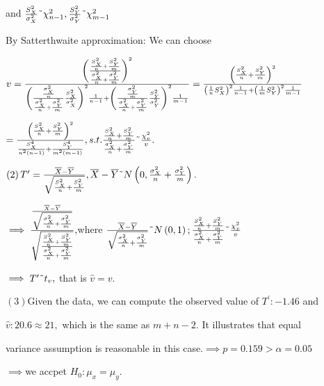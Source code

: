 \documentclass{article}
\begin{document}
and $\frac{S_{X}^{2}}{\sigma _{X}^{2}}\symbol{126}\chi _{n-1}^{2},\frac{%
S_{Y}^{2}}{\sigma _{Y}^{2}}\symbol{126}\chi _{m-1}^{2}$

By Satterthwaite approximation: We can choose 

$v=\frac{\left( \frac{\frac{S_{X}^{2}}{n}+\frac{S_{Y}^{2}}{m}}{\frac{\sigma
_{X}^{2}}{n}+\frac{\sigma _{Y}^{2}}{m}}\right) ^{2}}{\left( \frac{\frac{%
\sigma _{X}^{2}}{n}}{\frac{\sigma _{X}^{2}}{n}+\frac{\sigma _{Y}^{2}}{m}}%
\frac{S_{X}^{2}}{\sigma _{X}^{2}}\right) ^{2}\frac{1}{n-1}+\left( \frac{%
\frac{\sigma _{Y}^{2}}{m}}{\frac{\sigma _{X}^{2}}{n}+\frac{\sigma _{Y}^{2}}{m%
}}\frac{S_{Y}^{2}}{\sigma _{Y}^{2}}\right) ^{2}\frac{1}{m-1}}=\frac{\left( 
\frac{S_{X}^{2}}{n}+\frac{S_{Y}^{2}}{m}\right) ^{2}}{\left( \frac{1}{n}%
S_{X}^{2}\right) ^{2}\frac{1}{n-1}+\left( \frac{1}{m}S_{Y}^{2}\right) ^{2}%
\frac{1}{m-1}}$

$=\frac{\left( \frac{S_{X}^{2}}{n}+\frac{S_{Y}^{2}}{m}\right) ^{2}}{\frac{%
S_{X}^{4}}{n^{2}\left( n-1\right) }+\frac{S_{Y}^{4}}{m^{2}\left( m-1\right) }%
},s.t.\frac{\frac{S_{X}^{2}}{n}+\frac{S_{Y}^{2}}{m}}{\frac{\sigma _{X}^{2}}{n%
}+\frac{\sigma _{Y}^{2}}{m}}\symbol{126}\frac{\chi _{v}^{2}}{v}.$

$\left( 2\right) T^{\prime }=\frac{\overline{X}-\overline{Y}}{\sqrt{\frac{%
S_{X}^{2}}{n}+\frac{S_{Y}^{2}}{m}}},\overline{X}-\overline{Y}\symbol{126}%
N\left( 0,\frac{\sigma _{X}^{2}}{n}+\frac{\sigma _{Y}^{2}}{m}\right) .$

$\implies \frac{\frac{\overline{X}-\overline{Y}}{\sqrt{\frac{\sigma _{X}^{2}%
}{n}+\frac{\sigma _{Y}^{2}}{m}}}}{\sqrt{\frac{\frac{S_{X}^{2}}{n}+\frac{%
S_{Y}^{2}}{m}}{\frac{\sigma _{X}^{2}}{n}+\frac{\sigma _{Y}^{2}}{m}}}},$where 
$\frac{\overline{X}-\overline{Y}}{\sqrt{\frac{\sigma _{X}^{2}}{n}+\frac{%
\sigma _{Y}^{2}}{m}}}\symbol{126}N\left( 0,1\right) ;\frac{\frac{S_{X}^{2}}{n%
}+\frac{S_{Y}^{2}}{m}}{\frac{\sigma _{X}^{2}}{n}+\frac{\sigma _{Y}^{2}}{m}}%
\symbol{126}\frac{\chi _{v}^{2}}{v}$

$\implies T^{\prime }\symbol{126}t_{v},$ that is $\hat{v}=v.$

$\left( 3\right) $Given the data, we can compute the observed value of $%
T^{\prime }:-1.46$ and 

$\hat{v}:20.6\approx 21,$ which is the same as $m+n-2.$ It illustrates that
equal

variance assumption is reasonable in this case.$\implies p=0.159>\alpha =0.05
$

$\implies $we accpet $H_{0}:\mu _{x}=\mu _{y}.$
\end{document}
